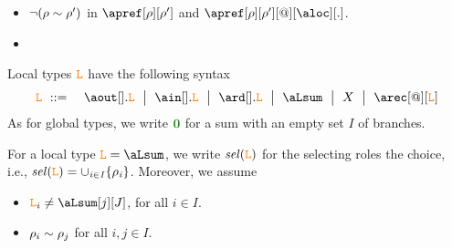 \begin{itemize}
	\item $\neg (\rho \sim \rho')$ in $\apref[\arole][\arole']$ and $\apref[\arole][\arole'][@][\aloc][.]$.
	\item 
\end{itemize}



Local types $\texttt{\textcolor{orange}L}$ have the following syntax
\begin{eqnarray*}
  \aL & \bnfdef & %
                  \aout[].\aL \bnfmid
                  \ain[].\aL \bnfmid
                  \ard[].\aL \bnfmid
                  \aLsum \bnfmid
                  X \bnfmid
                  \arec[@][\aL]
\end{eqnarray*}
As for global types, we write $\nil$ for a sum with an empty set $I$ of branches. 

For a local type $\aL = \aLsum$, we write $\it{sel}(\texttt{\textcolor{orange}L})$ for the selecting roles the choice, i.e.,
$\it{sel}(\texttt{\textcolor{orange}L}) = \cup_{i\in I}{\{\rho_i\}}$.
%
Moreover, we assume
\begin{itemize}
\item $\aL_i \neq\aLsum[j][J]$, for all $i \in I$.
\item $\rho_i \sim \rho_j$ for all $i,j \in I$.
\end{itemize}


